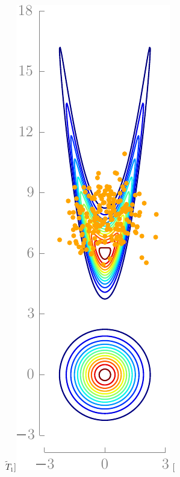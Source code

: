 \documentclass[twoside,11pt]{article}
\begin{document}
\begin{figure}[h]
\begin{center}
$\widetilde{T}_1$]{\includegraphics[scale=\scaleToolMovie]{toolExample_frame3-eps-converted-to.pdf}}
\hspace{\hspaceToolMovie}
\subfloat[\hspace{\hspaceCaptionToolMovie}

\end{center}
\end{figure}
\end{document}
